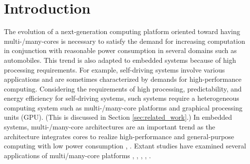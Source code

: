   
  
  
  \chapter{Introduction}
  \label{sec:introduction}
  The evolution of a next-generation computing platform oriented toward having multi-/many-cores is necessary to satisfy the demand for increasing computation in conjunction with reasonable power consumption in several domains such as automobiles.
  This trend is also adapted to embedded systems because of high processing requirements.
  For example, self-driving systems involve various applications and are sometimes characterized by demands for high-performance computing.
  Considering the requirements of high processing, predictability, and energy efficiency for self-driving systems, such systems require a heterogeneous computing system such as multi-/many-core platforms and graphical processing units (GPU).
  (This is discussed in Section \ref{sec:related_work}.)
   In embedded systems, multi-/many-core architectures are an important trend as the architecture integrates cores to realize high-performance and general-purpose computing with low power consumption \cite{becker2016contention}, \cite{perret2016mapping}.
  Extant studies have examined several applications of multi/many-core platforms \cite{becker2016contention}, \cite{saidi2015shift}, \cite{perret2016temporal}, \cite{perret2016mapping}, \cite{becker2014mapping} \cite{BURGIO2017299}.
  
